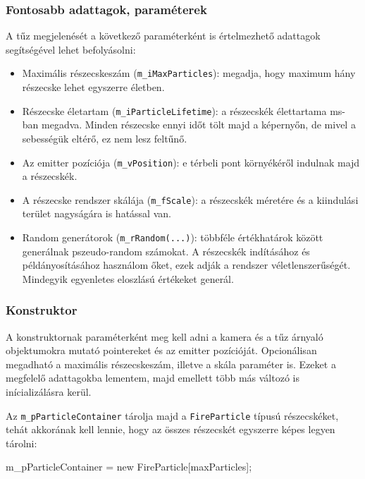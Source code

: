 \subsubsection{Fontosabb adattagok, paraméterek}
A tűz megjelenését a következő paraméterként is értelmezhető adattagok segítségével lehet befolyásolni:
\begin{itemize}
\item Maximális részecskeszám (\texttt{m\_iMaxParticles}): megadja, hogy maximum hány részecske lehet egyszerre életben.
\item Részecske életartam (\texttt{m\_iParticleLifetime}): a részecskék élettartama ms-ban megadva. Minden részecske ennyi időt tölt majd a képernyőn, de mivel a sebességük eltérő, ez nem lesz feltűnő.
\item Az emitter pozíciója (\texttt{m\_vPosition}): e térbeli pont környékéről indulnak majd a részecskék.
\item A részecske rendszer skálája (\texttt{m\_fScale}): a részecskék méretére és a kiindulási terület nagyságára is hatással van.
\item Random generátorok (\texttt{m\_rRandom(...)}): többféle értékhatárok között generálnak pszeudo-random számokat. A részecskék indításához és példányosításához használom őket, ezek adják a rendszer véletlenszerűségét. Mindegyik egyenletes eloszlású értékeket generál.
\end{itemize}

\subsubsection{Konstruktor}
A konstruktornak paraméterként meg kell adni a kamera és a tűz árnyaló objektumokra mutató pointereket és az emitter pozícióját. Opcionálisan megadható a maximális részecskeszám, illetve a skála paraméter is. Ezeket a megfelelő adattagokba lementem, majd emellett több más változó is inícializálásra kerül. 

Az \texttt{m\_pParticleContainer} tárolja majd a \texttt{FireParticle} típusú részecskéket, tehát akkorának kell lennie, hogy az összes részecskét egyszerre képes legyen tárolni:
\begin{cpp}
m_pParticleContainer = new FireParticle[maxParticles];
\end{cpp}

